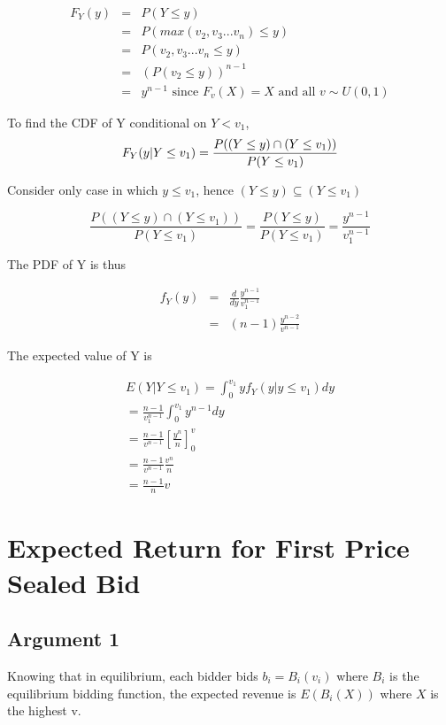 \documentclass[10pt, a4paper]{article}
\begin{document}
\begin{eqnarray}
   F_Y(y) & = & P(Y \le y) \nonumber \\
   & = & P(max(v_2, v_3 ... v_n) \le y) \nonumber \\
   & = & P(v_2, v_3 ... v_n \le y) \nonumber \\
   & = & (P(v_2 \le y))^{n-1} \nonumber \\
   & = & y^{n-1} \nonumber \text{ since $F_v(X) = X$ and all $v \sim U(0, 1)$}
\end{eqnarray}

To find the CDF of Y conditional on $Y < v_1$,
\begin{equation}
   F_Y(y |Y \le v_1) = \frac{P((Y \le y) \cap (Y \le v_1))}{P(Y \le v_1)} \nonumber \\
\end{equation}

Consider only case in which $ y \le v_1$, hence $(Y \le y) \subseteq (Y \le v_1)$

\begin{equation}
   \frac{P((Y \le y) \cap (Y \le v_1))}{P(Y \le v_1)} = \frac{P(Y \le y)}{P(Y \le v_1)}
   = \frac{y^{n-1}}{v_1^{n-1}} \nonumber
\end{equation}

The PDF of Y is thus

\begin{eqnarray}
   f_Y(y) & = & \frac{d}{dy}\frac{y^{n-1}}{v_1^{n-1}} \nonumber \\
   & = & (n-1)\frac{y^{n-2}}{v^{n-1}} \nonumber
\end{eqnarray}

The expected value of Y is 

\begin{align*}
   E(Y|Y \le v_1) = \int_{0}^{v_1} yf_Y(y|y \le v_1) dy \\
   = \frac{n-1}{v_1^{n-1}}\int_{0}^{v_1} y^{n-1} dy \\
   = \frac{n-1}{v^{n-1}} \left[\frac{y^n}{n}\right]^{v}_{0} \\
   = \frac{n-1}{v^{n-1}}\frac{v^n}{n} \\
   = \frac{n-1}{n} v
\end{align*}

\section{Expected Return for First Price Sealed Bid}
\subsection{Argument 1}
Knowing that in equilibrium, each bidder bids $b_i = B_i(v_i)$ where $B_i$ is the equilibrium bidding function, the expected revenue is $E(B_i(X))$ where $X$ is the highest v.
\end{document}
